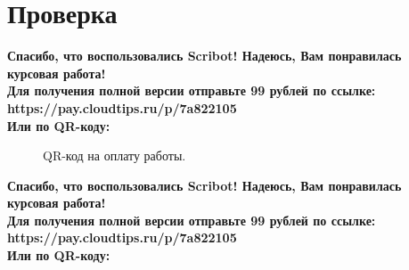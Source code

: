 \documentclass{article}
\begin{document}
\section{Проверка}
\begin{center}
    \textbf{
        Спасибо, что воспользовались Scribot! Надеюсь, Вам понравилась курсовая работа!\\
        Для получения полной версии отправьте 99 рублей по ссылке:\\
        https://pay.cloudtips.ru/p/7a822105\\
        Или по QR-коду:\\
    }
\end{center}
\begin{figure}[h]
    \caption{QR-код на оплату работы.}
    \label{ris:image}
\end{figure}
\newpage
\begin{center}
    \textbf{
        Спасибо, что воспользовались Scribot! Надеюсь, Вам понравилась курсовая работа!\\
        Для получения полной версии отправьте 99 рублей по ссылке:\\
        https://pay.cloudtips.ru/p/7a822105\\
        Или по QR-коду:\\
    }
\end{center}
\end{document}
